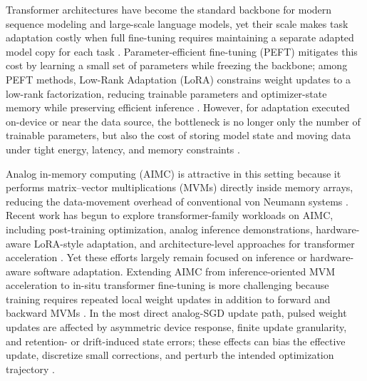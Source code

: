 \documentclass[AMA,LATO2COL]{WileyNJDv5}
\begin{document}
\noindent
Transformer architectures have become the standard backbone for modern sequence modeling and large-scale language models, yet their scale makes task adaptation costly when full fine-tuning requires maintaining a separate adapted model copy for each task \cite{vaswani2017attention,ding2023delta}.
Parameter-efficient fine-tuning (PEFT) mitigates this cost by learning a small set of parameters while freezing the backbone; among PEFT methods, Low-Rank Adaptation (LoRA) constrains weight updates to a low-rank factorization, reducing trainable parameters and optimizer-state memory while preserving efficient inference \cite{ding2023delta,hu2021lora}.
However, for adaptation executed on-device or near the data source, the bottleneck is no longer only the number of trainable parameters, but also the cost of storing model state and moving data under tight energy, latency, and memory constraints \cite{zhou2019edgeintelligence,sze2017efficient}.

\noindent
Analog in-memory computing (AIMC) is attractive in this setting because it performs matrix--vector multiplications (MVMs) directly inside memory arrays, reducing the data-movement overhead of conventional von Neumann systems \cite{ielmini2018imc,wan2022neurram,rasch2024fastrobust}.
Recent work has begun to explore transformer-family workloads on AIMC, including post-training optimization, analog inference demonstrations, hardware-aware LoRA-style adaptation, and architecture-level approaches for transformer acceleration \cite{lammie2024pt_roberta,chen2025albertanalog,li2026ahwa_lora,leroux2025aimc_attention,buchel2025moe_3d_aimc}.
Yet these efforts largely remain focused on inference or hardware-aware software adaptation.
Extending AIMC from inference-oriented MVM acceleration to in-situ transformer fine-tuning is more challenging because training requires repeated local weight updates in addition to forward and backward MVMs \cite{ambrogio2018analogtraining,rasch2024fastrobust,wu2025responsefunctions}.
In the most direct analog-SGD update path, pulsed weight updates are affected by asymmetric device response, finite update granularity, and retention- or drift-induced state errors; these effects can bias the effective update, discretize small corrections, and perturb the intended optimization trajectory \cite{ambrogio2018analogtraining,wu2025responsefunctions,rasch2024fastrobust,aguirre2024memristor_ann_review}.
\end{document}
